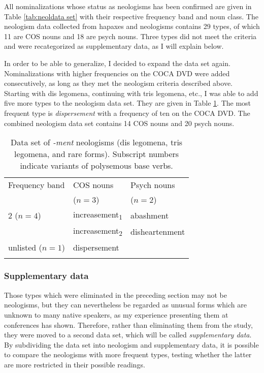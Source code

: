 All nominalizations whose status as neologisms has been confirmed are given in Table \ref{tab:neoldata set} with their respective frequency band and noun class. The neologism data collected from hapaxes and  neologisms contains 29 types, of which 11 are COS nouns and 18 are psych nouns. Three types did not meet the criteria and were recategorized as supplementary data, as I will explain below. 

In order to be able to generalize, I decided to expand the data set again. Nominalizations with higher frequencies on the COCA DVD were added consecutively, as long as they met the neologism criteria described above. Starting with dis legomena, continuing with tris legomena, etc., I was able to add five more types to the neologism data set. They are given in Table \ref{tab:neoldata set2}. The most frequent type is \textit{dispersement} with a frequency of ten on the COCA DVD. The combined neologism data set contains 14 COS nouns and 20 psych nouns. 

\begin{table} 
	\caption{Data set of \textit{-ment} neologisms (dis legomena, tris legomena, and rare forms). Subscript numbers indicate variants of polysemous base verbs.} \label{tab:neoldata set2}
		\begin{tabular}{lll}
			\lsptoprule
			Frequency band & COS nouns  &   Psych nouns \\
			&  ($n=3$) &  ($n=2$) \\
			\midrule 
			2 ($n=4$)&increasement\textsubscript{1}  & abashment \\
			& increasement\textsubscript{2}  & disheartenment\\
			unlisted ($n=1$)&dispersement &\\
			\lspbottomrule
		\end{tabular} 
\end{table}



\subsubsection{Supplementary data}
\label{sec:meth-revis-select-sub}

Those types which were eliminated in the preceding section may not be neologisms, but they can nevertheless be regarded as unusual forms which are unknown to many native speakers, as my experience presenting them at conferences has shown. Therefore, rather than eliminating them from the study, they were moved to a second data set, which will be called \textit{supplementary data}.  
By subdividing the data set into neologism and supplementary data, it is possible to compare the neologisms with more frequent types, testing whether the latter are more restricted in their possible readings. 

